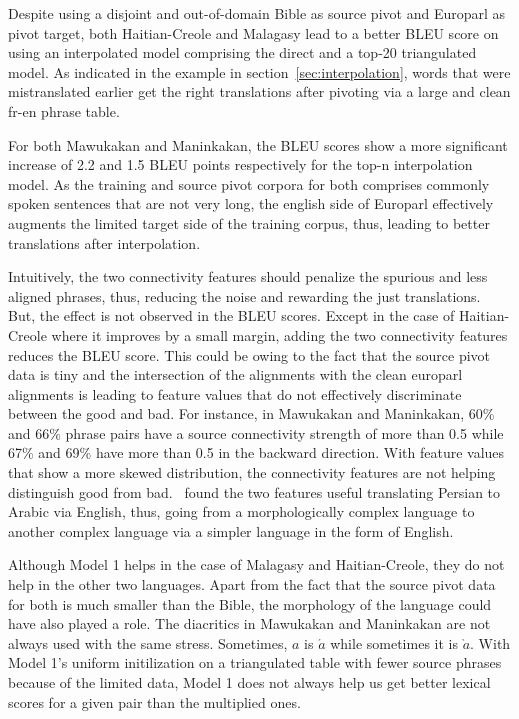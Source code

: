 Despite using a disjoint and out-of-domain Bible as source pivot and Europarl as pivot target, both Haitian-Creole and Malagasy lead to a better BLEU score on using an interpolated model comprising the direct and a top-20 triangulated model. As indicated in the example in section~\ref{sec:interpolation}, words that were mistranslated earlier get the right translations after pivoting via a large and clean fr-en phrase table.

For both Mawukakan and Maninkakan, the BLEU scores show a more significant increase of 2.2 and 1.5 BLEU points respectively for the top-n interpolation model. As the training and source pivot corpora for both comprises commonly spoken sentences that are not very long, the english side of Europarl effectively augments the limited target side of the training corpus, thus, leading to better translations after interpolation.

Intuitively, the two connectivity features should penalize the spurious and less aligned phrases, thus, reducing the noise and rewarding the just translations. But, the effect is not observed in the BLEU scores. Except in the case of Haitian-Creole where it improves by a small margin, adding the two connectivity features reduces the BLEU score. This could be owing to the fact that the source pivot data is tiny and the intersection of the alignments with the clean europarl alignments is leading to feature values that do not effectively discriminate between the good and bad. For instance, in Mawukakan and Maninkakan, 60\% and 66\% phrase pairs have a source connectivity strength of more than 0.5 while 67\% and 69\% have more than 0.5 in the backward direction. With feature values that show a more skewed distribution, the connectivity features are not helping distinguish good from bad.~\cite{Ahmed:13} found the two features useful translating Persian to Arabic via English, thus, going from a morphologically complex language to another complex language via a simpler language in the form of English.

Although Model 1 helps in the case of Malagasy and Haitian-Creole, they do not help in the other two languages. Apart from the fact that the source pivot data for both is much smaller than the Bible, the morphology of the language could have also played a role. The diacritics in Mawukakan and Maninkakan are not always used with the same stress. Sometimes, $a$ is $\acute{a}$ while sometimes it is $\grave{a}$. With Model 1's uniform initilization on a triangulated table with fewer source phrases because of the limited data, Model 1 does not always help us get better lexical scores for a given pair than the multiplied ones.

